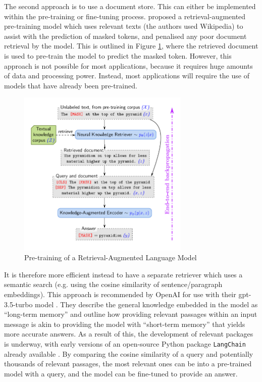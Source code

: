 The second approach is to use a document store. This can either be implemented within the pre-training or fine-tuning process. \citet{documentStoreGuu} proposed a retrieval-augmented pre-training model which uses relevant texts (the authors used Wikipedia) to assist with the prediction of masked tokens, and penalised any poor document retrieval by the model. This is outlined in Figure \ref{fig:document_store}, where the retrieved document is used to pre-train the model to predict the masked token. However, this approach is not possible for most applications, because it requires huge amounts of data and processing power. Instead, most applications will require the use of models that have already been pre-trained. 

\begin{figure}[h!]
    \centering
    \includegraphics[height=8cm,trim={0 0 0cm 0cm},clip]{paper/images/document_store.png}
    \caption{Pre-training of a Retrieval-Augmented Language Model \citep{documentStoreGuu}}
    \label{fig:document_store}
\end{figure}

It is therefore more efficient instead to have a separate retriever which uses a semantic search (e.g. using the cosine similarity of sentence/paragraph embeddings). This approach is recommended by OpenAI for use with their gpt-3.5-turbo model \citep{openai_cookbook_qa_embeddings}. They describe the general knowledge embedded in the model as ``long-term memory'' and outline how providing relevant passages within an input message is akin to providing the model with ``short-term memory'' that yields more accurate answers. As a result of this, the development of relevant packages is underway, with early versions of an open-source Python package \texttt{LangChain} already available \citep{langchain}. By comparing the cosine similarity of a query and potentially thousands of relevant passages, the most relevant ones can be into a pre-trained model with a query, and the model can be fine-tuned to provide an answer. 


